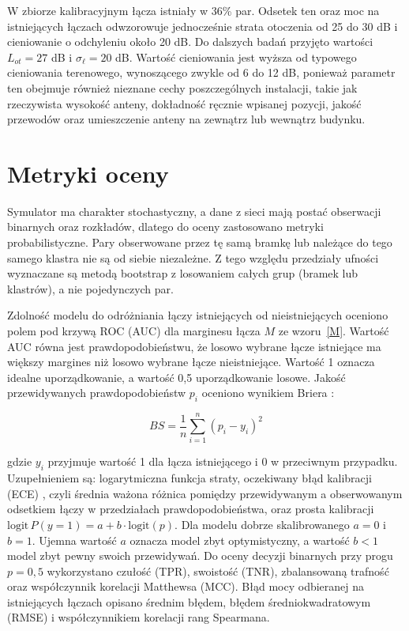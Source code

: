 W zbiorze kalibracyjnym łącza istniały w 36\% par. Odsetek ten oraz moc na istniejących łączach odwzorowuje jednocześnie strata otoczenia od 25 do 30 dB i cieniowanie o odchyleniu około 20 dB. Do dalszych badań przyjęto wartości \(L_{ot} = 27\) dB i \(\sigma_{\ell} = 20\) dB. Wartość cieniowania jest wyższa od typowego cieniowania terenowego, wynoszącego zwykle od 6 do 12 dB, ponieważ parametr ten obejmuje również nieznane cechy poszczególnych instalacji, takie jak rzeczywista wysokość anteny, dokładność ręcznie wpisanej pozycji, jakość przewodów oraz umieszczenie anteny na zewnątrz lub wewnątrz budynku.

\section{Metryki oceny}

Symulator ma charakter stochastyczny, a dane z sieci mają postać obserwacji binarnych oraz rozkładów, dlatego do oceny zastosowano metryki probabilistyczne. Pary obserwowane przez tę samą bramkę lub należące do tego samego klastra nie są od siebie niezależne. Z tego względu przedziały ufności wyznaczane są metodą bootstrap \cite{efron1993} z losowaniem całych grup (bramek lub klastrów), a nie pojedynczych par.

Zdolność modelu do odróżniania łączy istniejących od nieistniejących oceniono polem pod krzywą ROC (AUC) dla marginesu łącza \(M\) ze wzoru~\eqref{M}. Wartość AUC równa jest prawdopodobieństwu, że losowo wybrane łącze istniejące ma większy margines niż losowo wybrane łącze nieistniejące. Wartość 1 oznacza idealne uporządkowanie, a wartość 0,5 uporządkowanie losowe. Jakość przewidywanych prawdopodobieństw \(p_i\) oceniono wynikiem Briera \cite{brier1950}:

\begin{equation}\label{eq:brier}
BS = \frac{1}{n}\sum_{i=1}^{n} (p_i - y_i)^2
\end{equation}

gdzie \(y_i\) przyjmuje wartość 1 dla łącza istniejącego i 0 w przeciwnym przypadku. Uzupełnieniem są: logarytmiczna funkcja straty, oczekiwany błąd kalibracji (ECE) \cite{naeini2015}, czyli średnia ważona różnica pomiędzy przewidywanym a obserwowanym odsetkiem łączy w przedziałach prawdopodobieństwa, oraz prosta kalibracji \cite{cox1958} \(\textrm{logit}\,P(y=1) = a + b\cdot\textrm{logit}(p)\). Dla modelu dobrze skalibrowanego \(a = 0\) i \(b = 1\). Ujemna wartość \(a\) oznacza model zbyt optymistyczny, a wartość \(b < 1\) model zbyt pewny swoich przewidywań. Do oceny decyzji binarnych przy progu \(p = 0{,}5\) wykorzystano czułość (TPR), swoistość (TNR), zbalansowaną trafność oraz współczynnik korelacji Matthewsa (MCC). Błąd mocy odbieranej na istniejących łączach opisano średnim błędem, błędem średniokwadratowym (RMSE) i współczynnikiem korelacji rang Spearmana.

